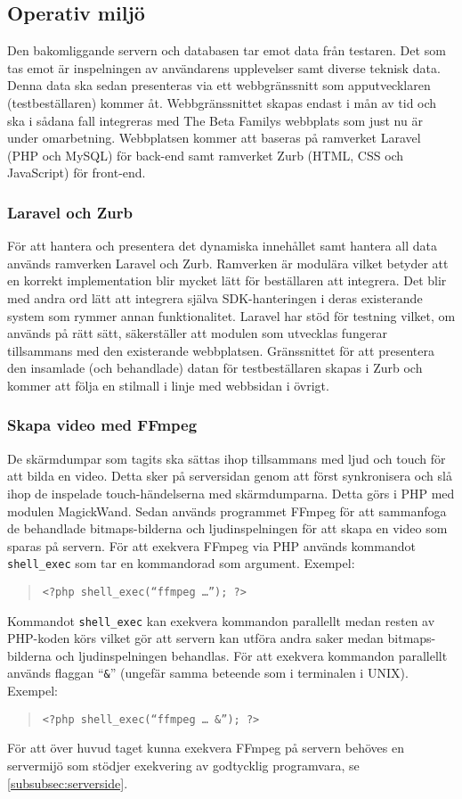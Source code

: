 \subsection{Operativ miljö}
\label{subsec:environment}

Den bakomliggande servern och databasen tar emot data från testaren. Det som tas emot är inspelningen av användarens upplevelser samt diverse teknisk data. Denna data ska sedan presenteras via ett webbgränssnitt som apputvecklaren (testbeställaren) kommer åt. Webbgränssnittet skapas endast i mån av tid och ska i sådana fall integreras med The Beta Familys webbplats som just nu är under omarbetning. Webbplatsen kommer att baseras på ramverket Laravel (PHP och MySQL) för back-end samt ramverket Zurb (HTML, CSS och JavaScript) för front-end.

\subsubsection{Laravel och Zurb}
För att hantera och presentera det dynamiska innehållet samt hantera all data används ramverken Laravel och Zurb. Ramverken är modulära vilket betyder att en korrekt implementation blir mycket lätt för beställaren att integrera. Det blir med andra ord lätt att integrera själva SDK-hanteringen i deras existerande system som rymmer annan funktionalitet. Laravel har stöd för testning vilket, om används på rätt sätt, säkerställer att modulen som utvecklas fungerar tillsammans med den existerande webbplatsen. Gränssnittet för att presentera den insamlade (och behandlade) datan för testbeställaren skapas i Zurb och kommer att följa en stilmall i linje med webbsidan i övrigt.

\subsubsection{Skapa video med FFmpeg}
De skärmdumpar som tagits ska sättas ihop tillsammans med ljud och touch för att bilda en video. Detta sker på serversidan genom att först synkronisera och slå ihop de inspelade touch-händelserna med skärmdumparna. Detta görs i PHP med modulen MagickWand\parencite{magickwand}. Sedan används programmet FFmpeg\parencite{ffmpeg} för att sammanfoga de behandlade bitmaps-bilderna och ljudinspelningen för att skapa en video som sparas på servern. För att exekvera FFmpeg via PHP används kommandot \texttt{shell\_exec}\parencite{shellexec} som tar en kommandorad som argument. Exempel:
\begin{quote}
\texttt{<?php shell\_exec(``ffmpeg \dots''); ?>}
\end{quote}
Kommandot \texttt{shell\_exec} kan exekvera kommandon parallellt medan resten av PHP-koden körs vilket gör att servern kan utföra andra saker medan bitmaps-bilderna och ljudinspelningen behandlas. För att exekvera kommandon parallellt används flaggan ``\texttt{\&}'' (ungefär samma beteende som i terminalen i UNIX). Exempel:
\begin{quote}
\texttt{<?php shell\_exec(``ffmpeg \dots~\&''); ?>}
\end{quote}
För att över huvud taget kunna exekvera FFmpeg på servern behöves en servermijö som stödjer exekvering av godtycklig programvara, se \ref{subsubsec:serverside}.